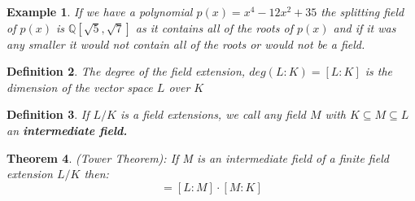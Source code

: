 \documentclass[12pt]{article}
\newtheorem{theorem}{Theorem}
\newtheorem{definition}[theorem]{Definition}
\newtheorem{example}[theorem]{Example}
\begin{document}
\begin{example}
    If we have a polynomial \(p(x) = x^4 - 12x^2 + 35\) the splitting field of
    \(p(x)\) is \(\mathbb{Q}[\sqrt{5},\sqrt{7}]\) as it contains all of the
    roots
    of \(p(x)\) and if it was any smaller it would not contain all of the roots
    or
    would not be a field.
\end{example}
\begin{definition}
    The degree of the field extension, $deg(L:K)=[L:K]$ is the dimension of the
    vector space $L$ over $K$
\end{definition}

\begin{definition}
    If $L/K$ is a field extensions, we call any field $M$ with $K \subseteq M
        \subseteq L$ an \textbf{intermediate field.}
\end{definition}
\begin{theorem}
    (Tower Theorem): If M is an intermediate field of a finite field extension
    $L/K$ then:
    \begin{equation*}
        [L:K] = [L:M]\cdot[M:K]
    \end{equation*}
\end{theorem}
\end{document}
